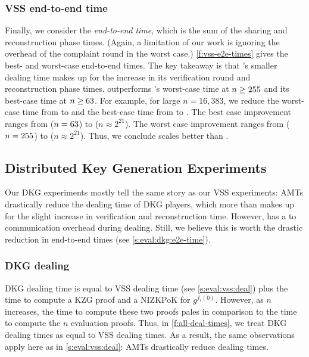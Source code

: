
\subsubsection{VSS end-to-end time}
\label{s:eval:vss:end-to-end}
Finally, we consider the \textit{end-to-end time}, which is the sum of the sharing and reconstruction phase times.
(Again, a limitation of our work is ignoring the overhead of the complaint round in the worst case.)
\cref{f:vss-e2e-times} gives the best- and worst-case end-to-end times.
The key takeaway is that \ourvss's smaller dealing time makes up for the increase in its verification round and reconstruction phase times.
\ourvss outperforms \evss's worst-case time at $n\ge 255$ and its best-case time at $n\ge 63$.
For example, for large $n=16,383$, we reduce the worst-case time from  to  and the best-case time from  to .
The best case improvement ranges from \amtVssEndToEndBcTimeImprovOverevss{\vssOutperformBcN} ($n=63$) to  ($n\approx 2^{21}$).
The worst case improvement ranges from \amtVssEndToEndWcTimeImprovOverevss{\vssOutperformWcN} ($n=255$) to  ($n\approx 2^{21}$).
Thus, we conclude \ourvss scales better than \evss.

\subsection{Distributed Key Generation Experiments}
\label{s:eval:dkg}

Our DKG experiments mostly tell the same story as our VSS experiments:
AMTs drastically reduce the dealing time of DKG players, which more than makes up for the slight increase in verification and reconstruction time.
However, \ourdkg has a  to  communication overhead during dealing.
Still, we believe this is worth the drastic reduction in end-to-end times (see \cref{s:eval:dkg:e2e-time}).

\subsubsection{DKG dealing}
DKG dealing time is equal to VSS dealing time (see \cref{s:eval:vss:deal}) plus the time to compute a KZG proof and a NIZKPoK for $g^{f_i(0)}$.
However, as $n$ increases, the time to compute these two proofs pales in comparison to the time to compute the $n$ evaluation proofs.
Thus, in \cref{f:all-deal-times}, we treat DKG dealing times as equal to VSS dealing times.
As a result, the same observations apply here as in \cref{s:eval:vss:deal}: AMTs drastically reduce dealing times.

